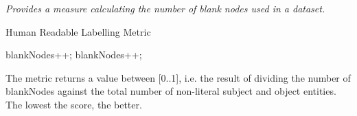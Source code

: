 \begin{mdframed}[style=metricdefinition]
\emph{Provides a measure calculating the number of blank nodes used in a dataset.}
\end{mdframed}

\begin{algorithm}
\caption{Human Readable Labelling Metric}
\begin{algorithmic}[1]
 blankNodes++; \EndIf
{} blankNodes++;   \EndIf 
\EndProcedure
\end{algorithmic}
\end{algorithm}

The metric returns a value between [0..1], i.e. the result of dividing the number of blankNodes against the total number of non-literal subject and object entities. The lowest the score, the better.

